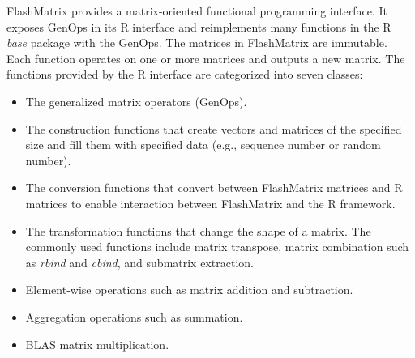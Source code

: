 FlashMatrix provides a matrix-oriented functional programming interface.
It exposes GenOps in its R interface and reimplements many functions
in the R \textit{base} package with the GenOps. The matrices in FlashMatrix
are immutable. Each function operates on one or more matrices and outputs
a new matrix. The functions provided by the R interface are categorized into
seven classes:
\begin{itemize}
	\item The generalized matrix operators (GenOps).
	\item The construction functions that create vectors and matrices of
		the specified size and fill them with specified data (e.g., sequence
		number or random number).
	\item The conversion functions that convert between FlashMatrix matrices and
		R matrices to enable interaction between FlashMatrix and the R framework.
	\item The transformation functions that change the shape of a matrix.
		The commonly used functions include matrix transpose, matrix combination
		such as \textit{rbind} and \textit{cbind}, and submatrix extraction.
	\item Element-wise operations such as matrix addition and subtraction.
	\item Aggregation operations such as summation.
	\item BLAS matrix multiplication.
\end{itemize}




